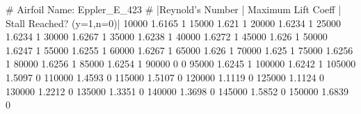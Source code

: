 # Airfoil Name: Eppler_E_423
# |Reynold's Number | Maximum Lift Coeff | Stall Reached? (y=1,n=0)|
10000 1.6165 1
15000 1.621 1
20000 1.6234 1
25000 1.6234 1
30000 1.6267 1
35000 1.6238 1
40000 1.6272 1
45000 1.626 1
50000 1.6247 1
55000 1.6255 1
60000 1.6267 1
65000 1.626 1
70000 1.625 1
75000 1.6256 1
80000 1.6256 1
85000 1.6254 1
90000 0  0
95000 1.6245 1
100000 1.6242 1
105000 1.5097 0
110000 1.4593 0
115000 1.5107 0
120000 1.1119 0
125000 1.1124 0
130000 1.2212 0
135000 1.3351 0
140000 1.3698 0
145000 1.5852 0
150000 1.6839 0
